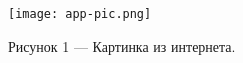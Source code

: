  \hypertarget{app-a}{\label{app-a}}


\begin{figure}[H]
    \centering
    \texttt{[image: app-pic.png]}
    \caption*{Рисунок 1 --- Картинка из интернета.}
\end{figure}


\clearpage